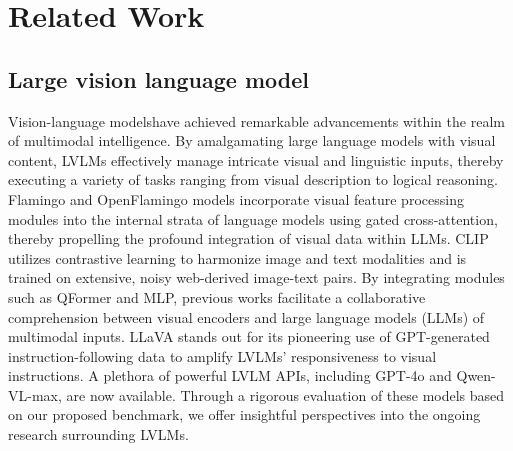 \section{Related Work}
\label{sec:Related Work}
\subsection{Large vision language model}
Vision-language models\cite{li2023blip,li2024llava,bai2023qwen,lu2024deepseekvlrealworldvisionlanguageunderstanding, alayrac2022flamingo,sun2024generativemultimodalmodelsincontext}have achieved remarkable advancements within the realm of multimodal intelligence. By amalgamating large language models\cite{ray2023chatgpt,achiam2023gpt,anil2023palm,touvron2023llama2openfoundation,touvron2023llamaopenefficientfoundation} with visual content, LVLMs effectively manage intricate visual and linguistic inputs, thereby executing a variety of tasks ranging from visual description to logical reasoning. Flamingo\cite{alayrac2022flamingo} and OpenFlamingo\cite{awadalla2023openflamingoopensourceframeworktraining} models incorporate visual feature processing modules into the internal strata of language models using gated cross-attention, thereby propelling the profound integration of visual data within LLMs. CLIP\cite{radford2021learning,sun2023evaclipimprovedtrainingtechniques} utilizes contrastive learning to harmonize image and text modalities and is trained on extensive, noisy web-derived image-text pairs. By integrating modules such as QFormer\cite{li2023blip} and MLP\cite{liu2024visual}, previous works\cite{bai2023qwen, dai2023instructblipgeneralpurposevisionlanguagemodels,Liu_2024_CVPR} facilitate a collaborative comprehension between visual encoders and large language models (LLMs) of multimodal inputs. LLaVA\cite{liu2024visual} stands out for its pioneering use of GPT-generated instruction-following data to amplify LVLMs' responsiveness to visual instructions. A plethora of powerful LVLM APIs, including GPT-4o\cite{achiam2023gpt} and Qwen-VL-max\cite{bai2023qwen}, are now available. Through a rigorous evaluation of these models based on our proposed benchmark, we offer insightful perspectives into the ongoing research surrounding LVLMs.
